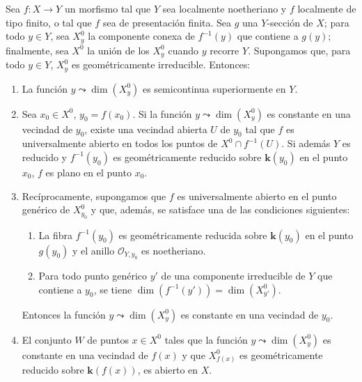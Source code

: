 \begin{proposition}[15.6.6]
\label{IV.15.6.6}
Sea $f:X\to Y$ un morfismo tal que $Y$ sea localmente noetheriano y $f$ localmente de tipo finito, \textup{o} tal que $f$ sea de presentación finita.
Sea $g$ una $Y$-sección de $X$; para todo $y\in Y$, sea $X_y^0$ la componente conexa de $f^{-1}(y)$ que contiene a $g(y)$; finalmente, sea $X^0$ la unión de los $X_y^0$ cuando $y$ recorre $Y$.
Supongamos que, para todo $y\in Y$, $X_y^0$ es geométricamente irreducible.
Entonces:
\begin{enumerate}[label=(\roman*)]
  \item La función $y\leadsto\dim(X_y^0)$ es semicontinua superiormente en $Y$.
  \item Sea $x_0\in X^0$, $y_0=f(x_0)$.
Si la función $y\leadsto\dim(X_y^0)$ es constante en una vecindad de $y_0$, existe una vecindad abierta $U$ de $y_0$ tal que $f$ es universalmente abierto en todos los puntos de $X^0\cap f^{-1}(U)$.
Si además $Y$ es reducido y $f^{-1}(y_0)$ es geométricamente reducido sobre $\boldsymbol{k}(y_0)$ en el punto $x_0$, $f$ es plano en el punto $x_0$.
  \item Recíprocamente, supongamos que $f$ es universalmente abierto en el punto genérico de $X_{y_0}^0$ y que, además, se satisface \textup{una} de las condiciones siguientes:
  \begin{enumerate}
    \item[$\alpha$)] La fibra $f^{-1}(y_0)$ es geométricamente reducida sobre $\boldsymbol{k}(y_0)$ en el punto $g(y_0)$ y el anillo $\mathcal O_{Y,y_0}$ es noetheriano.
    \item[$\beta$)] Para todo punto genérico $y'$ de una componente irreducible de $Y$ que contiene a $y_0$, se tiene $\dim(f^{-1}(y'))=\dim(X_{y'}^0)$.
  \end{enumerate}
Entonces la función $y\leadsto\dim(X_y^0)$ es constante en una vecindad de $y_0$.
  \item El conjunto $W$ de puntos $x\in X^0$ tales que la función $y\leadsto\dim(X_y^0)$ es constante en una vecindad de $f(x)$ y que $X_{f(x)}^0$ es geométricamente reducido sobre $\boldsymbol{k}(f(x))$, es abierto en $X$.
\end{enumerate}
\end{proposition}

